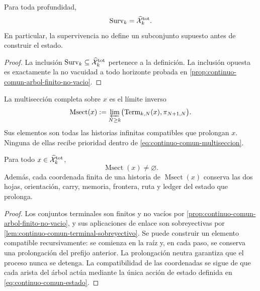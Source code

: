\begin{theorem}
\label{thm:continuo-comun-total-superviviente}
Para toda profundidad,
\begin{equation}
\label{eq:continuo-comun-surv-igual-total}
 \operatorname{Surv}_k=\widehat{\mathcal X}^{\rm tot}_k.
\end{equation}
En particular, la supervivencia no define un subconjunto supuesto antes de
construir el estado.
\end{theorem}

\begin{proof}
La inclusión \(\operatorname{Surv}_k\subseteq
\widehat{\mathcal X}^{\rm tot}_k\) pertenece a la definición.  La inclusión
opuesta es exactamente la no vacuidad a todo horizonte probada en
\cref{prop:continuo-comun-arbol-finito-no-vacio}.
\end{proof}

\begin{definition}
\label{def:continuo-comun-multiseccion}
La multisección completa sobre \(x\) es el límite inverso
\begin{equation}
\label{eq:continuo-comun-multiseccion}
 \operatorname{Msect}(x)
 :=\varprojlim_{N\geq k}
 \bigl(\operatorname{Term}_{k,N}(x),\pi_{N+1,N}\bigr).
\end{equation}
Sus elementos son todas las historias infinitas compatibles que prolongan
\(x\).  Ninguna de ellas recibe prioridad dentro de
\eqref{eq:continuo-comun-multiseccion}.
\end{definition}

\begin{theorem}
\label{thm:continuo-comun-multiseccion-no-vacia}
Para todo \(x\in\widehat{\mathcal X}^{\rm tot}_k\),
\begin{equation}
\label{eq:continuo-comun-multiseccion-no-vacia}
 \operatorname{Msect}(x)\neq\varnothing.
\end{equation}
Además, cada coordenada finita de una historia de
\(\operatorname{Msect}(x)\) conserva las dos hojas, orientación, carry,
memoria, frontera, ruta y ledger del estado que prolonga.
\end{theorem}

\begin{proof}
Los conjuntos terminales son finitos y no vacíos por
\cref{prop:continuo-comun-arbol-finito-no-vacio}, y sus aplicaciones de
enlace son sobreyectivas por
\cref{lem:continuo-comun-terminal-sobreyectivo}.  Se puede construir un
elemento compatible recursivamente: se comienza en la raíz y, en cada paso,
se conserva una prolongación del prefijo anterior.  La prolongación neutra
garantiza que el proceso nunca se detenga.  La compatibilidad de las
coordenadas se sigue de que cada arista del árbol actúa mediante la única
acción de estado definida en
\eqref{eq:continuo-comun-estado}.
\end{proof}

